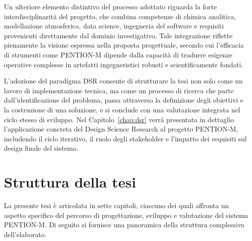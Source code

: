 Un ulteriore elemento distintivo del processo adottato riguarda la forte interdisciplinarità del progetto, che combina competenze di chimica analitica, modellazione atmosferica, data science, ingegneria del software e requisiti provenienti direttamente dal dominio investigativo. Tale integrazione riflette pienamente la visione espressa nella proposta progettuale, secondo cui l’efficacia di strumenti come \textsc{PENTION-M} dipende dalla capacità di tradurre esigenze operative complesse in artefatti ingegneristici robusti e scientificamente fondati.

L’adozione del paradigma DSR consente di strutturare la tesi non solo come un lavoro di implementazione tecnica, ma come un processo di ricerca che parte dall’identificazione del problema, passa attraverso la definizione degli obiettivi e la costruzione di una soluzione, e si conclude con una valutazione integrata nel ciclo stesso di sviluppo.
Nel Capitolo~\ref{chap:dsr} verrà presentata in dettaglio l’applicazione concreta del Design Science Research al progetto \textsc{PENTION-M}, includendo il ciclo iterativo, il ruolo degli stakeholder e l’impatto dei requisiti sul design finale del sistema.

\section{Struttura della tesi}

La presente tesi è articolata in sette capitoli, ciascuno dei quali affronta un aspetto specifico del percorso di progettazione, sviluppo e valutazione del sistema \textsc{PENTION-M}.
Di seguito si fornisce una panoramica della struttura complessiva dell’elaborato.

